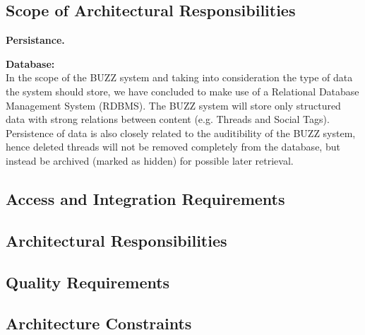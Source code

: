 
\subsection{Scope of Architectural Responsibilities}
\begin{flushleft}
	\textbf{Persistance.}
	\begin{flushleft}
	\textbf{Database: } \\
	In the scope of the BUZZ system and taking into consideration the type of data the system should store, we have concluded to make use of a Relational Database Management System (RDBMS). The BUZZ system will store only structured data with strong relations between content (e.g. Threads and Social Tags). Persistence of data is also closely related to the auditibility of the BUZZ system, hence deleted threads will not be removed completely from the database, but instead be archived (marked as hidden) for possible later retrieval.
	\end{flushleft}
\end{flushleft}

\subsection{Access and Integration Requirements}
\subsection{Architectural Responsibilities}
\subsection{Quality Requirements}
	
	
\subsection{Architecture Constraints}